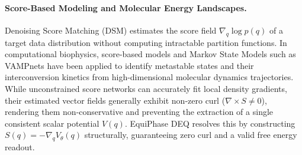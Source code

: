 \paragraph{Score-Based Modeling and Molecular Energy Landscapes.}
Denoising Score Matching (DSM) \cite{song2019generative, song2021scorebased} estimates the score field $\nabla_q \log p(q)$ of a target data distribution without computing intractable partition functions. In computational biophysics, score-based models and Markov State Models such as VAMPnets \cite{mardt2018vampnets, wu2020variational} have been applied to identify metastable states and their interconversion kinetics from high-dimensional molecular dynamics trajectories. While unconstrained score networks can accurately fit local density gradients, their estimated vector fields generally exhibit non-zero curl ($\nabla \times S \neq 0$), rendering them non-conservative and preventing the extraction of a single consistent scalar potential $V(q)$. EquiPhase DEQ resolves this by constructing $S(q) = -\nabla_q V_\theta(q)$ structurally, guaranteeing zero curl and a valid free energy readout.
